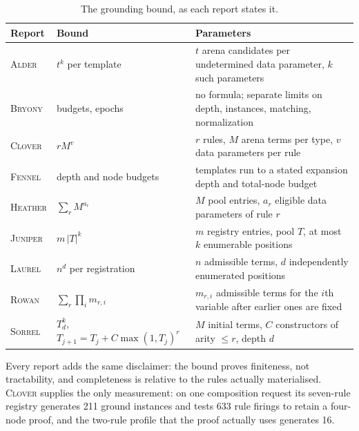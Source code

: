 \documentclass[11pt,a4paper]{article}
\newcommand{\Al}{\textsc{Alder}}
\newcommand{\Br}{\textsc{Bryony}}
\newcommand{\Cl}{\textsc{Clover}}
\newcommand{\Fe}{\textsc{Fennel}}
\newcommand{\He}{\textsc{Heather}}
\newcommand{\Ju}{\textsc{Juniper}}
\newcommand{\La}{\textsc{Laurel}}
\newcommand{\Ro}{\textsc{Rowan}}
\newcommand{\So}{\textsc{Sorrel}}
\theoremstyle{definition}
\theoremstyle{plain}
\begin{document}
\begin{table}[htbp]\small
\caption{The grounding bound, as each report states it.}\label{tab:bounds}
\begin{tabularx}{\textwidth}{@{}l l Y@{}}
\toprule
Report & Bound & Parameters\\\midrule
\Al & $t^k$ per template & $t$ arena candidates per undetermined data parameter, $k$ such parameters\\
\Br & budgets, epochs & no formula; separate limits on depth, instances, matching, normalization\\
\Cl & $rM^v$ & $r$ rules, $M$ arena terms per type, $v$ data parameters per rule\\
\Fe & depth and node budgets & templates run to a stated expansion depth and total-node budget\\
\He & $\sum_r M^{a_r}$ & $M$ pool entries, $a_r$ eligible data parameters of rule $r$\\
\Ju & $m\,|T|^k$ & $m$ registry entries, pool $T$, at most $k$ enumerable positions\\
\La & $n^d$ per registration & $n$ admissible terms, $d$ independently enumerated positions\\
\Ro & $\sum_r\prod_i m_{r,i}$ & $m_{r,i}$ admissible terms for the $i$th variable after earlier ones are fixed\\
\So & $T_d^k$, $T_{j+1}=T_j+C\max(1,T_j)^r$ & $M$ initial terms, $C$ constructors of arity $\le r$, depth $d$\\
\bottomrule
\end{tabularx}
\end{table}

Every report adds the same disclaimer: the bound proves finiteness, not tractability, and completeness is relative to the rules actually materialised. \Cl{} supplies the only measurement: on one composition request its seven-rule registry generates 211 ground instances and tests 633 rule firings to retain a four-node proof, and the two-rule profile that the proof actually uses generates 16.
\end{document}
